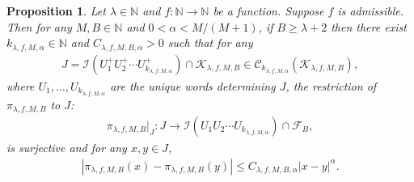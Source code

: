\documentclass[12pt,reqno]{amsart}
\theoremstyle{definition}
\theoremstyle{plain}
\newtheorem{prop}{Proposition}
\begin{document}
\begin{prop}
\label{prop:local-holder-final}
Let $\lambda\in\mathbb{N}$ and $f:\mathbb{N}\to\mathbb{N}$ be a function. Suppose $f$ is admissible. Then for any $M,B\in\mathbb{N}$ and $0<\alpha<M/(M+1)$, if $B\geq\lambda+2$ then there exist $k_{\lambda,f,M,\alpha}\in\mathbb{N}$ and $C_{\lambda,f,M,B,\alpha}>0$ such that for any
\begin{align*}
    J
    =\mathcal{I}\!\left(U^+_1U^+_2\cdots U^+_{k_{\lambda,f,M,\alpha}}\right)\cap\mathcal{K}_{\lambda,f,M,B}
    \in\mathscr{C}_{k_{\lambda,f,M,\alpha}}(\mathcal{K}_{\lambda,f,M,B}),
\end{align*}
where \(U_1,\ldots,U_{k_{\lambda,f,M,\alpha}}\) are the unique words determining \(J\), the restriction of $\pi_{\lambda,f,M,B}$ to $J$:
\begin{align*}
    \pi_{\lambda,f,M,B}|_J:J\to \mathcal{I}\!\left(U_1U_2\cdots U_{k_{\lambda,f,M,\alpha}}\right)\cap\mathcal{F}_B,
\end{align*}
is surjective and
for any $x,y\in J$,
\begin{align*}
    \left|\pi_{\lambda,f,M,B}(x)-\pi_{\lambda,f,M,B}(y)\right|
    \leq C_{\lambda,f,M,B,\alpha} \left|x-y\right|^\alpha.
\end{align*}
\end{prop}
\end{document}
